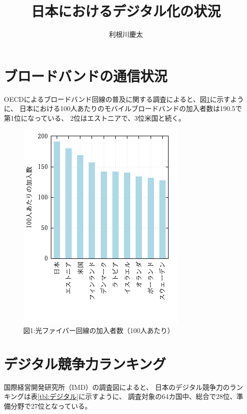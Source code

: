 \documentclass[a4paper,11pt,dvipdfmx]{ujarticle}
\title{日本におけるデジタル化の状況}
\author{利根川慶太}
\begin{document}
\maketitle %

 \section{ブロードバンドの通信状況}

 OECDによるブロードバンド回線の普及に関する調査\cite{oecd}によると、図\ref{fig:ランキング}に示すように、
 日本における100人あたりのモバイルブロードバンドの加入者数は190.5で第1位になっている、
 2位はエストニアで、3位米国と続く。


\begin{figure}[htbp]
     \centering
     \includegraphics{fig21.png}
     \caption{図1:光ファイバー回線の加入者数（100人あたり）}\label{fig:ランキング}
\end{figure}

\section{デジタル競争力ランキング}
国際経営開発研究所（IMD）の調査図\cite{imd}によると、
日本のデジタル競争力のランキングは表\ref{tbl:デジタル}に示すように、
調査対象の64カ国中、総合で28位、準備分野で27位となっている。
\end{document}
